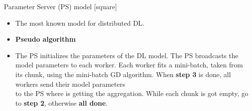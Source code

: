 \begin{frame}{Parameter Server (PS) model}
    [square]
    \begin{itemize}
        \item{The most known model for distributed DL.}
        \vspace{0.2}
        \item{\textbf{Pseudo algorithm}}
        \vspace{0.1}
        \item[]{
        \begin{algorithm}[H]
            \begin{algorithmic}[1]
                \STATE The PS initializes the parameters of the DL model.
                \STATE The PS broadcasts the model parameters to each worker.
                \STATE Each worker fits a mini-batch, taken from its chunk, using the mini-batch GD algorithm.
                \STATE When \textbf{step 3} is done, all workers send their model parameters\\to the PS where is getting the aggregation.
                \STATE While each chunk is got empty, go to \textbf{step 2}, otherwise \textbf{all done}.
            \end{algorithmic}
            \label{alg:param-server}
        \end{algorithm}
        }
    \end{itemize}
\end{frame}